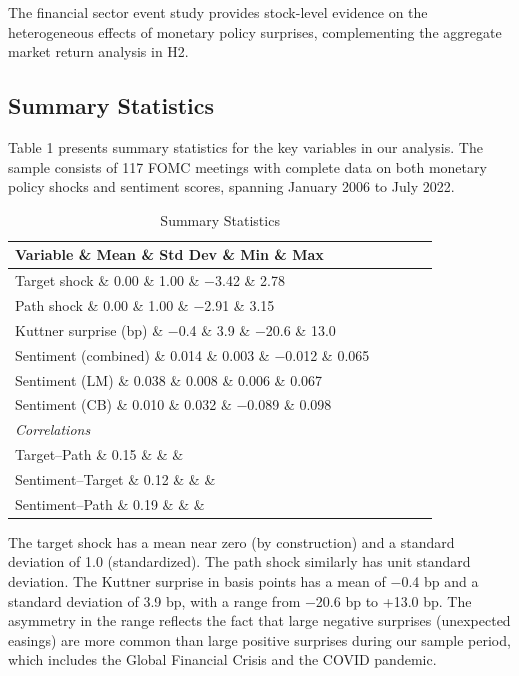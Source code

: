 The financial sector event study provides stock-level evidence on the heterogeneous effects of monetary policy surprises, complementing the aggregate market return analysis in H2.

\subsection{Summary Statistics}

Table 1 presents summary statistics for the key variables in our analysis. The sample consists of 117 FOMC meetings with complete data on both monetary policy shocks and sentiment scores, spanning January 2006 to July 2022.


\begin{table}[htbp]
\centering
\caption{Summary Statistics}
\label{tab:summary}
\begin{tabular}{lcccc}
\toprule
Variable \& Mean \& Std Dev \& Min \& Max \\
\midrule
Target shock \& 0.00 \& 1.00 \& $-$3.42 \& 2.78 \\
Path shock \& 0.00 \& 1.00 \& $-$2.91 \& 3.15 \\
Kuttner surprise (bp) \& $-$0.4 \& 3.9 \& $-$20.6 \& 13.0 \\
Sentiment (combined) \& 0.014 \& 0.003 \& $-$0.012 \& 0.065 \\
Sentiment (LM) \& 0.038 \& 0.008 \& 0.006 \& 0.067 \\
Sentiment (CB) \& 0.010 \& 0.032 \& $-$0.089 \& 0.098 \\
\midrule
\multicolumn{5}{l}{\textit{Correlations}} \\
Target--Path \& 0.15 \& \& \& \\
Sentiment--Target \& 0.12 \& \& \& \\
Sentiment--Path \& 0.19 \& \& \& \\
\bottomrule
\end{tabular}
\par\vspace{2pt}{\footnotesize Sample: 117 FOMC meetings, January 2006 to July 2022. Target and path shocks are standardized to unit variance. Kuttner surprise in basis points.}
\end{table}


The target shock has a mean near zero (by construction) and a standard deviation of 1.0 (standardized). The path shock similarly has unit standard deviation. The Kuttner surprise in basis points has a mean of $-$0.4 bp and a standard deviation of 3.9 bp, with a range from $-$20.6 bp to +13.0 bp. The asymmetry in the range reflects the fact that large negative surprises (unexpected easings) are more common than large positive surprises during our sample period, which includes the Global Financial Crisis and the COVID pandemic.

